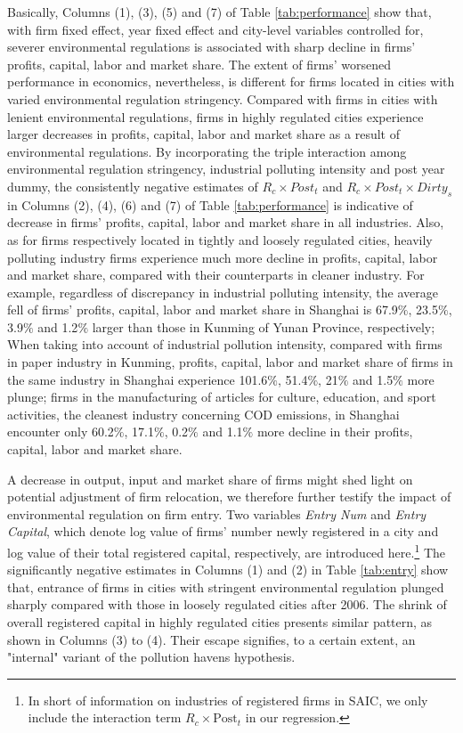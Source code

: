 \documentclass[12pt,english]{article}
\begin{document}
Basically, Columns (1), (3), (5) and (7) of Table \ref{tab:performance} show that, with firm fixed effect, year fixed effect and city-level variables controlled for, severer environmental regulations is associated with sharp decline in firms' profits, capital, labor and market share. The extent of firms' worsened performance in economics, nevertheless, is different for firms located in cities with varied environmental regulation stringency. Compared with firms in cities with lenient environmental regulations, firms in highly regulated cities experience larger decreases in profits, capital, labor and market share as a result of environmental regulations. By incorporating the triple interaction among environmental regulation stringency, industrial polluting intensity and post year dummy, the consistently negative estimates of $R_{c}\times Post_{t}$ and $R_{c}\times Post_{t}\times Dirty_{s}$ in Columns (2), (4), (6) and (7) of Table \ref{tab:performance} is indicative of decrease in firms' profits, capital, labor and market share in all industries. Also, as for firms respectively located in tightly and loosely regulated cities, heavily polluting industry firms experience much more decline in profits, capital, labor and market share, compared with their counterparts in cleaner industry. For example, regardless of discrepancy in industrial polluting intensity, the average fell of firms' profits, capital, labor and market share in Shanghai is 67.9$\%$, 23.5$\%$, 3.9$\%$ and 1.2$\%$ larger than those in Kunming of Yunan Province, respectively; When taking into account of industrial pollution intensity, compared with firms in paper industry in Kunming, profits, capital, labor and market share of firms in the same industry in Shanghai experience 101.6$\%$, 51.4$\%$, 21$\%$ and 1.5$\%$ more plunge; firms in the manufacturing of articles for culture, education, and sport activities, the cleanest industry concerning COD emissions, in Shanghai encounter only 60.2$\%$, 17.1$\%$, 0.2$\%$ and 1.1$\%$ more decline in their profits, capital, labor and market share.




A decrease in output, input and market share of firms might shed light on potential adjustment of firm relocation, we therefore further testify the impact of environmental regulation on firm entry. Two variables \textit{Entry Num} and \textit{Entry Capital}, which denote log value of firms' number newly registered in a city and log value of their total registered capital, respectively, are introduced here.\footnote{In short of information on industries of registered firms in SAIC, we only include the interaction term ${R}_{c} \times \text{Post}_{t}$ in our regression.} The significantly negative estimates in Columns (1) and (2) in Table \ref{tab:entry} show that, entrance of firms in cities with stringent environmental regulation plunged sharply compared with those in loosely regulated cities after 2006. The shrink of overall registered capital in highly regulated cities presents similar pattern, as shown in Columns (3) to (4). Their escape signifies, to a certain extent, an "internal" variant of the pollution havens hypothesis.
\end{document}
